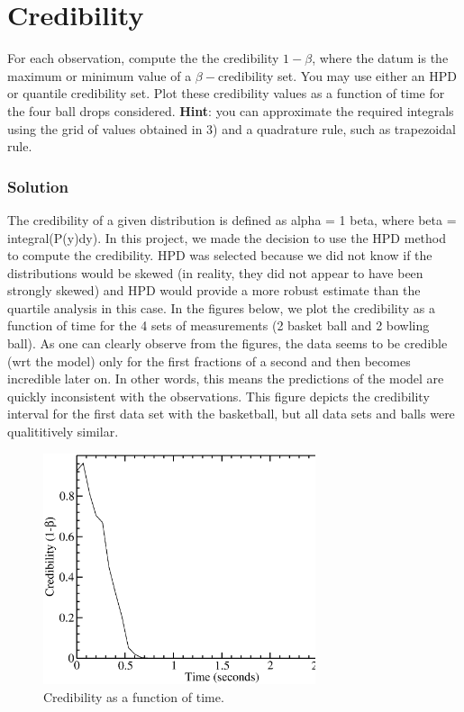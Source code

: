 \documentclass{article}
\begin{document}
\section{Credibility}

For each observation, compute the the credibility $1-\beta$, where
the datum is the maximum or minimum value of a $\beta-$credibility
set. You may use either an HPD or quantile credibility set. Plot these
credibility values as a function of time for the four ball drops considered.
\textbf{Hint}: you can approximate the required integrals using the
grid of values obtained in 3) and a quadrature rule, such as trapezoidal
rule.


\subsubsection*{Solution}

The credibility of a given distribution is defined as alpha = 1 \textendash{}
beta, where beta = integral(P(y)dy). In this project, we made the
decision to 
use the HPD method to compute the credibility. HPD was selected because
we did not know if the distributions would be skewed (in reality, they
did not appear to have been strongly skewed) and HPD would provide a
more robust estimate than the quartile analysis in this case. 
In the figures below, we
plot the credibility as a function of time for the 4 sets of measurements
(2 basket ball and 2 bowling ball). As one can clearly observe from
the figures, the data seems to be credible (wrt the model) only for
the first fractions of a second and then becomes incredible later on. In other
words, this means the predictions of the model are quickly inconsistent with the
observations. This figure depicts the credibility interval for the first
data set with the basketball, but all data sets and balls were
qualititively similar. 

\begin{figure}[H]
\begin{centering}
\includegraphics[width=8cm]{figs/credibility} 
\par\end{centering}
\caption{Credibility as a function of time.}

\label{fig:Uc} 
\end{figure}
\end{document}
